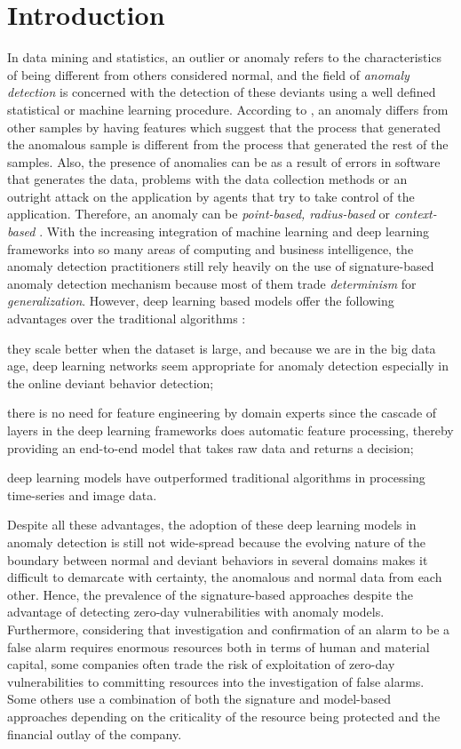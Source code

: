 \section{Introduction}
\label{sec:introduction}
In data mining and statistics, an outlier or anomaly refers to the characteristics of being different from others considered normal, and the field of \emph{anomaly detection} is concerned with the detection of these deviants using a well defined statistical or machine learning procedure\cite{wang2019progress,yuansurveyacmanom}. According to \cite{hawkins1980identification}, an anomaly differs from other samples by having features which suggest that the process that generated the anomalous sample is different from the process that generated the rest of the samples. Also, the presence of anomalies can be as a result of errors in software that generates the data, problems with the data collection methods or an outright attack on the application by agents that try to take control of the application. Therefore, an anomaly can be \textit{point-based, radius-based} or \textit{context-based} \cite{liu2012isolation}.
With the increasing integration of machine learning and deep learning frameworks into so many areas of computing and business intelligence, the anomaly detection practitioners still rely heavily on the use of signature-based anomaly detection mechanism because most of them trade \textit{determinism} for \textit{generalization}. However, deep learning based models offer the following advantages over the traditional algorithms \cite{bahnsen_2017,chalapathy2019deep}:
\begin{enumerate*}[label={\alph*)},font={\bfseries}]
	\item they scale better when the dataset is large, and because we are in the big data age, deep learning networks seem appropriate for anomaly detection especially in the online deviant behavior detection;
	\item there is no need for feature engineering by domain experts since the cascade of layers in the deep learning frameworks does automatic feature processing, thereby providing an end-to-end model that takes raw data and returns a decision;
	\item deep learning models have outperformed traditional algorithms in processing time-series and image data.
\end{enumerate*}
Despite all these advantages, the adoption of these deep learning models in anomaly detection is still not wide-spread because the evolving nature of the boundary between normal and deviant behaviors in several domains makes it difficult to demarcate with certainty, the anomalous and normal data from each other. Hence, the prevalence of the signature-based approaches despite the advantage of detecting zero-day vulnerabilities with anomaly models. Furthermore, considering that investigation and confirmation of an alarm to be a false alarm requires enormous resources both in terms of human and material capital, some companies often trade the risk of exploitation of zero-day vulnerabilities to committing resources into the investigation of false alarms. Some others use a combination of both the signature and model-based approaches depending on the criticality of the resource being protected and the financial outlay of the company.  
